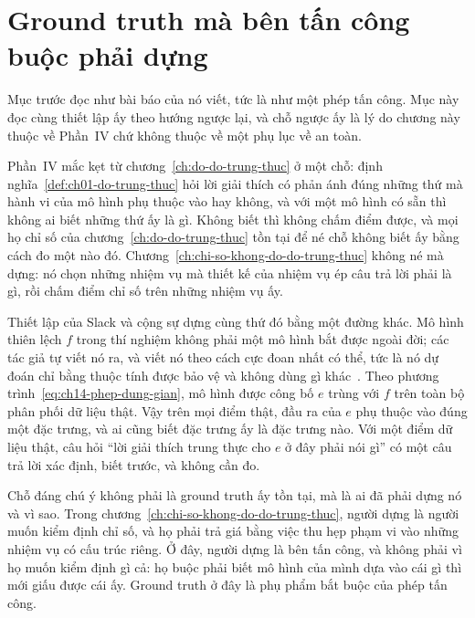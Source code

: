 \section{Ground truth mà bên tấn công buộc phải dựng}
\label{sec:ch14-ground-truth-ke-tan-cong}

%
Mục trước đọc  như bài báo của nó viết, tức là
như một phép tấn công. Mục này đọc cùng thiết lập ấy theo hướng ngược lại, và
chỗ ngược ấy là lý do chương này thuộc về Phần~IV chứ không thuộc về một phụ
lục về an toàn.

Phần~IV mắc kẹt từ chương~\ref{ch:do-do-trung-thuc} ở một chỗ: định
nghĩa~\ref{def:ch01-do-trung-thuc} hỏi lời giải thích có phản ánh đúng những
thứ mà hành vi của mô hình phụ thuộc vào hay không, và với một mô hình có sẵn
thì không ai biết những thứ ấy là gì. Không biết thì không chấm điểm được, và
mọi họ chỉ số của chương~\ref{ch:do-do-trung-thuc} tồn tại để né chỗ không biết
ấy bằng cách đo một  nào đó.
Chương~\ref{ch:chi-so-khong-do-do-trung-thuc} không né mà dựng: nó chọn những
nhiệm vụ mà thiết kế của nhiệm vụ ép câu trả lời phải là gì, rồi chấm điểm chỉ
số trên những nhiệm vụ ấy.

%
Thiết lập của Slack và cộng sự dựng cùng thứ đó bằng một đường khác. Mô hình
thiên lệch $f$ trong thí nghiệm không phải một mô hình bắt được ngoài đời; các
tác giả tự viết nó ra, và viết nó theo cách cực đoan nhất có thể, tức là nó dự
đoán chỉ bằng thuộc tính được bảo vệ và không dùng gì khác~\autocite{mfooling}.
Theo phương trình~\ref{eq:ch14-phep-dung-gian}, mô hình được công bố $e$ trùng
với $f$ trên toàn bộ phân phối dữ liệu thật. Vậy trên mọi điểm thật, đầu ra của
$e$ phụ thuộc vào đúng một đặc trưng, và ai cũng biết đặc trưng ấy là đặc trưng
nào. Với một điểm dữ liệu thật, câu hỏi \enquote{lời giải thích trung thực cho
$e$ ở đây phải nói gì} có một câu trả lời xác định, biết trước, và không cần
đo.

Chỗ đáng chú ý không phải là ground truth ấy tồn tại, mà là ai đã phải dựng nó
và vì sao. Trong chương~\ref{ch:chi-so-khong-do-do-trung-thuc}, người dựng là
người muốn kiểm định chỉ số, và họ phải trả giá bằng việc thu hẹp phạm vi vào
những nhiệm vụ có cấu trúc riêng. Ở đây, người dựng là bên tấn công, và không
phải vì họ muốn kiểm định gì cả: họ buộc phải biết mô hình của mình dựa vào cái
gì thì mới giấu được cái ấy. Ground truth ở đây là phụ phẩm bắt buộc của phép
tấn công.

